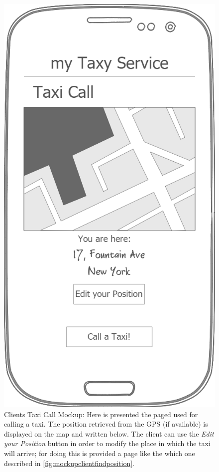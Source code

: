 \documentclass[a4paper]{article}
\begin{document}
\begin{figure}[H]
\includegraphics[width=\mockupWidth]{Mockup-ClientsTaxiCall}
\centering
\caption[Clients Taxi Call Mockup]{Clients Taxi Call Mockup: \newline Here is presented the paged used for calling a taxi. The  position retrieved from the GPS (if available) is displayed on the map and written below. The client can use the \emph{Edit your Position} button in order to modify the place in which the taxi will arrive; for doing this is provided a page like the which one described in  \autoref{fig:mockupclientfindposition}.}
\label{fig:mockupclienttaxicall}
\end{figure}
\end{document}
